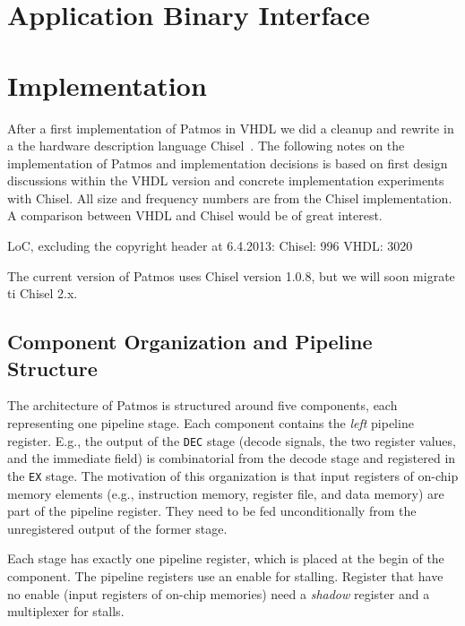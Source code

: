 \documentclass[a4paper,fontsize=10pt,twoside,DIV15,BCOR12mm,headinclude=true,footinclude=false,pagesize,bibtotoc]{scrbook}
\newcommand{\code}[1]{{\texttt{#1}}}
\newcommand{\comment}[3]{

\textsf{\textbf{#1}} {\color{#3}#2}}
\newcommand{\martin}[1]{\comment{Martin}{#1}{Blue}}
\renewcommand{\martin}[1]{}
\begin{document}
\chapter{Application Binary Interface}
\label{sec:abi}




\chapter{Implementation}

\martin{This sections shall describe implementation details,
decisions, and options.}

After a first implementation of Patmos in VHDL we did a cleanup and
rewrite in a the hardware description language Chisel~\cite{chisel:dac2012}.
The following notes on the implementation of Patmos and implementation
decisions is based on first design discussions within the VHDL version
and concrete implementation experiments with Chisel. All size and frequency
numbers are from the Chisel implementation. A comparison between VHDL
and Chisel would be of great interest.

LoC, excluding the copyright header at 6.4.2013:
Chisel: 996
VHDL: 3020

The current version of Patmos uses Chisel version 1.0.8, but we will soon
migrate ti Chisel 2.x.

\section{Component Organization and Pipeline Structure}

The architecture of Patmos is structured around five components, each
representing one pipeline stage. Each component contains the \emph{left}
pipeline register. E.g., the output of the \code{DEC} stage (decode signals,
the two register values, and the immediate field) is combinatorial from
the decode stage and registered in the \code{EX} stage. The motivation of
this organization is that input registers of on-chip memory elements (e.g., instruction
memory, register file, and data memory) are part of the pipeline register.
They need to be fed unconditionally from the unregistered output of
the former stage.

Each stage has exactly one pipeline register, which is placed at the begin
of the component. The pipeline registers use an enable for stalling.
Register that have no enable (input registers of on-chip memories) need
a \emph{shadow} register and a multiplexer for stalls.
\end{document}
